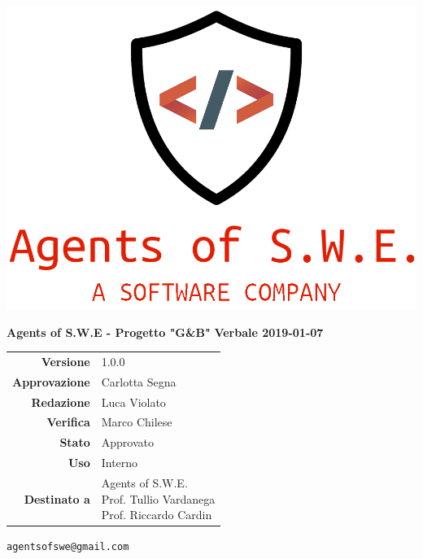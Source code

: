 


\begin{titlepage}
\thispagestyle{empty}

\begin{center}


\includegraphics[scale=0.3]{./images/logo.png} 


\large \textbf{Agents of S.W.E - Progetto "G\&B"}
\vfill
\Huge \textbf{Verbale 2019-01-07}
\vfill
\large
\renewcommand{\arraystretch}{1.3}
\begin{tabular}{r|l}
\textbf{Versione} & 1.0.0\\
\textbf{Approvazione} & Carlotta Segna\\
\textbf{Redazione} & \parbox[t]{5cm}{Luca Violato}\\
\textbf{Verifica} & \parbox[t]{5cm}{Marco Chilese}\\
\textbf{Stato} & Approvato\\
\textbf{Uso} & Interno\\
\textbf{Destinato a} & \parbox[t]{5cm}{Agents of S.W.E. \\Prof. Tullio Vardanega\\Prof. Riccardo Cardin}
\end{tabular}
\vfill
\small
\texttt{agentsofswe@gmail.com}
\end{center}
\end{titlepage}

\pagebreak



\pagebreak


	









